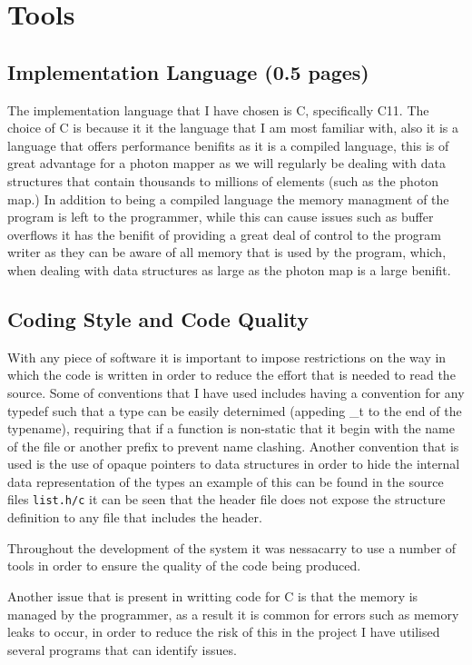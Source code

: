 \section{Tools} 

\subsection{Implementation Language (0.5 pages)}
The implementation language that I have chosen is C, specifically C11. The choice of C is because it it the
language that I am most familiar with, also it is a language that offers performance benifits as it is a compiled
language, this is of great advantage for a photon mapper as we will regularly be dealing with data structures
that contain thousands to millions of elements (such as the photon map.) In addition to being a compiled language
the memory managment of the program is left to the programmer, while this can cause issues such as buffer overflows
it has the benifit of providing a great deal of control to the program writer as they can be aware of all memory
that is used by the program, which, when dealing with data structures as large as the photon map is a large benifit.

\subsection{Coding Style and Code Quality}
With any piece of software it is important to impose restrictions on the way in which the code is written in order
to reduce the effort that is needed to read the source. Some of conventions that I have used includes having a
convention for any typedef such that a type can be easily deternimed (appeding \_t to the end of the typename),
requiring that if a function is non-static that it begin with the name of the file or another prefix to prevent
name clashing. Another convention that is used is the use of opaque pointers to data structures in order to
hide the internal data representation of the types an example of this can be found in the source files \texttt{list.h/c}
it can be seen that the header file does not expose the structure definition to any file that includes the header.

Throughout the development of the system it was nessacarry to use a number of tools in order to ensure the
quality of the code being produced.

Another issue that is present in writting code for C is that the memory is managed by the programmer, as a
result it is common for errors such as memory leaks to occur, in order to reduce the risk of this in the project
I have utilised several programs that can identify issues.

